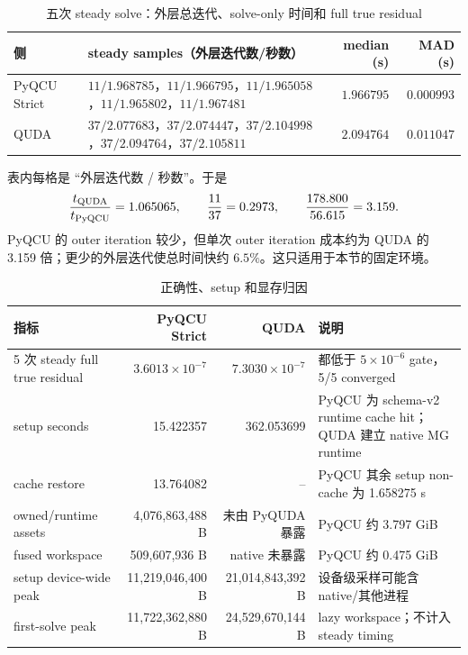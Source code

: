 \documentclass[UTF8,a4paper,11pt]{ctexart}
\begin{document}
\begin{table}[htbp]
\centering
\caption{五次 steady solve：外层总迭代、solve-only 时间和 full true residual}
\small
\begin{tabularx}{\textwidth}{@{}L{0.15\textwidth}Yrr@{}}
\toprule
侧 & steady samples（外层迭代数/秒数） & median (s) & MAD (s) \\
\midrule
PyQCU Strict &
$11/1.968785$，$11/1.966795$，$11/1.965058$，$11/1.965802$，$11/1.967481$ &
$1.966795$ & $0.000993$ \\
QUDA &
$37/2.077683$，$37/2.074447$，$37/2.104998$，$37/2.094764$，$37/2.105811$ &
$2.094764$ & $0.011047$ \\
\bottomrule
\end{tabularx}
\end{table}
表内每格是 ``外层迭代数 / 秒数''。于是
\begin{equation}
 \frac{t_{\rm QUDA}}{t_{\rm PyQCU}}=1.065065,
 \qquad
 \frac{11}{37}=0.2973,
 \qquad
 \frac{178.800}{56.615}=3.159 .
 \label{eq:timing-ratios}
\end{equation}
PyQCU 的 outer iteration 较少，但单次 outer iteration 成本约为 QUDA 的
3.159 倍；更少的外层迭代使总时间快约 $6.5\%$。这只适用于本节的固定环境。

\begin{table}[htbp]
\centering
\caption{正确性、setup 和显存归因}
\small
\begin{tabularx}{\textwidth}{@{}p{}rrX@{}}
\toprule
指标 & PyQCU Strict & QUDA & 说明 \\
\midrule
5 次 steady full true residual & $3.6013\times10^{-7}$ &
$7.3030\times10^{-7}$ & 都低于 $5\times10^{-6}$ gate，5/5 converged \\
setup seconds & 15.422357 & 362.053699 & PyQCU 为 schema-v2 runtime cache hit；
QUDA 建立 native MG runtime \\
cache restore & 13.764082 & -- & PyQCU 其余 setup non-cache 为 1.658275 s \\
owned/runtime assets & 4,076,863,488 B & 未由 PyQUDA 暴露 & PyQCU 约 3.797 GiB \\
fused workspace & 509,607,936 B & native 未暴露 & PyQCU 约 0.475 GiB \\
setup device-wide peak & 11,219,046,400 B & 21,014,843,392 B & 设备级采样可能含 native/其他进程 \\
first-solve peak & 11,722,362,880 B & 24,529,670,144 B & lazy workspace；不计入 steady timing \\
\bottomrule
\end{tabularx}
\end{table}
\end{document}
